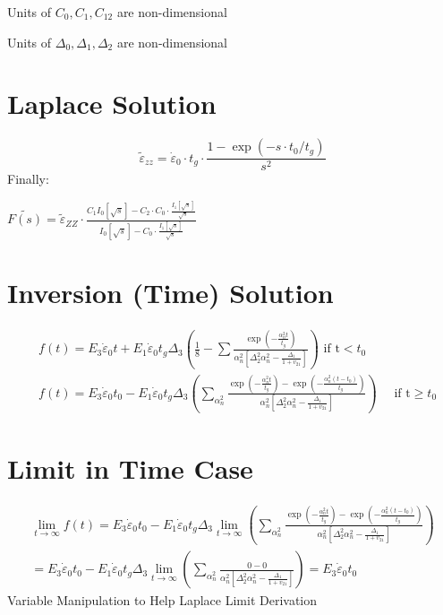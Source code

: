 \documentclass[10pt]{article}
\begin{document}
Units of $C_{0}, C_{1}, C_{12}$ are non-dimensional

Units of $\Delta_{0}, \Delta_{1}, \Delta_{2}$ are non-dimensional

\section{Laplace Solution}
$$
\tilde{\varepsilon}_{z z}=\dot{\varepsilon}_{0} \cdot t_{g} \cdot \frac{1-\exp \left(-s \cdot t_{0} / t_{g}\right)}{s^{2}}
$$
Finally:

$\widetilde{F(s)}=\tilde{\varepsilon}_{Z Z} \cdot \frac{C_{1} I_{0}[\sqrt{s}]-C_{2} \cdot C_{0} \cdot \frac{I_{1}[\sqrt{s}]}{\sqrt{s}}}{I_{0}[\sqrt{s}]-C_{0} \cdot \frac{I_{1}[\sqrt{s}]}{\sqrt{s}}}$

\section{Inversion (Time) Solution}
$$
\begin{aligned}
&f(t)=E_{3} \dot{\varepsilon}_{0} t+E_{1} \dot{\varepsilon}_{0} t_{g} \Delta_{3}\left(\frac{1}{8}-\sum \frac{\exp \left(-\frac{\alpha_{n}^{2} t}{t_{g}}\right)}{\alpha_{n}^{2}\left[\Delta_{2}^{2} \alpha_{n}^{2}-\frac{\Delta_{1}}{1+v_{21}}\right]}\right) \text { if } \mathrm{t}<t_{0} \\
&f(t)=E_{3} \dot{\varepsilon}_{0} t_{0}-E_{1} \dot{\varepsilon}_{0} t_{g} \Delta_{3}\left(\sum_{\alpha_{n}^{2}} \frac{\exp \left(-\frac{\alpha_{n}^{2} t}{t_{g}}\right)-\exp \left(-\frac{\alpha_{n}^{2}\left(t-t_{0}\right)}{t_{g}}\right)}{\alpha_{n}^{2}\left[\Delta_{2}^{2} \alpha_{n}^{2}-\frac{\Delta_{1}}{1+v_{21}}\right]}\right) \quad \text { if } \mathrm{t} \geq t_{0}
\end{aligned}
$$

\section{Limit in Time Case}
$$
\begin{gathered}
\lim _{t \rightarrow \infty} f(t)=E_{3} \dot{\varepsilon}_{0} t_{0}-E_{1} \dot{\varepsilon}_{0} t_{g} \Delta_{3} \lim _{t \rightarrow \infty}\left(\sum_{\alpha_{n}^{2}} \frac{\exp \left(-\frac{\alpha_{n}^{2} t}{t_{g}}\right)-\exp \left(-\frac{\alpha_{n}^{2}\left(t-t_{0}\right)}{t_{g}}\right)}{\alpha_{n}^{2}\left[\Delta_{2}^{2} \alpha_{n}^{2}-\frac{\Delta_{1}}{1+v_{21}}\right]}\right) \\
=E_{3} \dot{\varepsilon}_{0} t_{0}-E_{1} \dot{\varepsilon}_{0} t_{g} \Delta_{3} \lim _{t \rightarrow \infty}\left(\sum_{\alpha_{n}^{2}} \frac{0-0}{\alpha_{n}^{2}\left[\Delta_{2}^{2} \alpha_{n}^{2}-\frac{\Delta_{1}}{1+v_{21}}\right]}\right)=E_{3} \dot{\varepsilon}_{0} t_{0}
\end{gathered}
$$
Variable Manipulation to Help Laplace Limit Derivation
\end{document}
